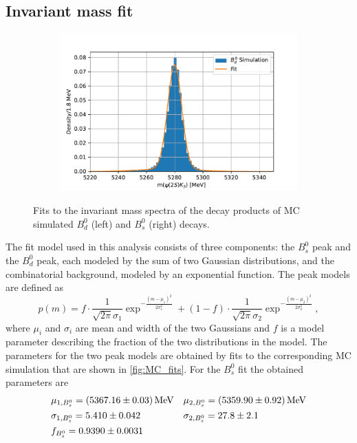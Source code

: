 \subsection{Invariant mass fit}
\begin{figure}[tb]
  \centering
  \begin{subfigure}{.5\textwidth}
    \includegraphics[width=\linewidth]{plots/B0_fit.pdf}
  \end{subfigure}
  \begin{subfigure}{.5\textwidth}
  \end{subfigure}
  \caption{Fits to the invariant mass spectra of the decay products of MC simulated $B^0_d$ (left) and $B^0_s$ (right) decays.}
  \label{fig:MC_fits}
\end{figure}
The fit model used in this analysis consists of three components: the $B^0_s$ peak and the $B^0_d$ peak, each modeled by the sum of two Gaussian distributions, and the combinatorial background, modeled by an exponential function.
The peak models are defined as
\begin{equation*}
  p(m) = f\cdot\frac{1}{\sqrt{2\pi}\sigma_1} \exp^{-\frac{(m - \mu_1)^2}{2 \sigma_1^2}} + (1 - f)\cdot \frac{1}{\sqrt{2\pi}\sigma_2} \exp^{-\frac{(m - \mu_2)^2}{2 \sigma_2^2}},
\end{equation*}
where $\mu_i$ and $\sigma_i$ are mean and width of the two Gaussians and $f$ is a model parameter describing the fraction of the two distributions in the model.
The parameters for the two peak models are obtained by fits to the corresponding MC simulation that are shown in \autoref{fig:MC_fits}. For the $B^0_s$ fit the obtained parameters are
\begin{align*}
  &\mu_{1, B^0_s} = \SI{5367.16 \pm 0.03}{\mega\eV} && \mu_{2, B^0_s} = \SI{5359.9 \pm 0.92}{\mega\eV}\\
  &\sigma_{1, B^0_s} = \num{5.41 \pm 0.042} && \sigma_{2, B^0_s} = \num{27.8 \pm 2.1}\\
  &f_{B^0_s} = \num{0.939 \pm 0.0031}
\end{align*}
